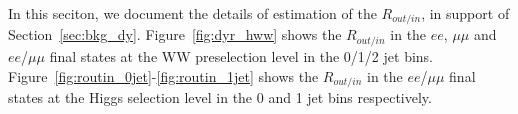 In this seciton, we document the details of estimation of the $R_{out/in}$, 
in support of Section~\ref{sec:bkg_dy}. 
Figure~\ref{fig:dyr_hww} shows the $R_{out/in}$ in the $ee$, $\mu\mu$ 
and $ee$/$\mu\mu$ final states at the WW preselection level in 
the 0/1/2 jet bins. 
Figure~\ref{fig:routin_0jet}-\ref{fig:routin_1jet} shows the $R_{out/in}$ in the 
$ee$/$\mu\mu$ final states at the Higgs selection level in the 
0 and 1 jet bins respectively. 

\begin{figure}[!hbtp]

\centering
{}
\centering
{}

\end{figure}
